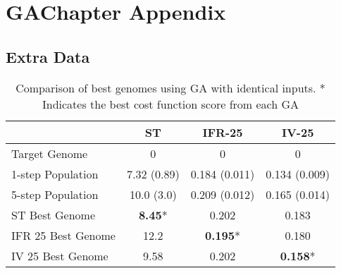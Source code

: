 
\section{GAChapter Appendix}\label{sec:GA:chapter-5-appendix}

\subsection{Extra Data}

\begin{table}[htp]
  \centering
  \caption{Comparison of best genomes using GA with
    identical inputs. * Indicates the best cost function score from
    each GA}\label{tab:4}
  \begin{tabular}{lccc}
\toprule
                   &       ST       &     IFR-25      & IV-25 \\
\midrule
  Target Genome    &       0        &        0        & 0 \\ %
1-step Population  &  7.32 (0.89)   &  0.184 (0.011)  & 0.134 (0.009)\\ %
5-step Population  &   10.0 (3.0)   &  0.209 (0.012)  & 0.165 (0.014) \\ %
 ST Best Genome    & \textbf{8.45}* &      0.202      & 0.183 \\ %
IFR 25 Best Genome  &      12.2      & \textbf{0.195}* & 0.180 \\ %
IV 25 Best Genome  &      9.58      &      0.202      & \textbf{0.158}* \\ %
\bottomrule
\end{tabular}
\end{table}


